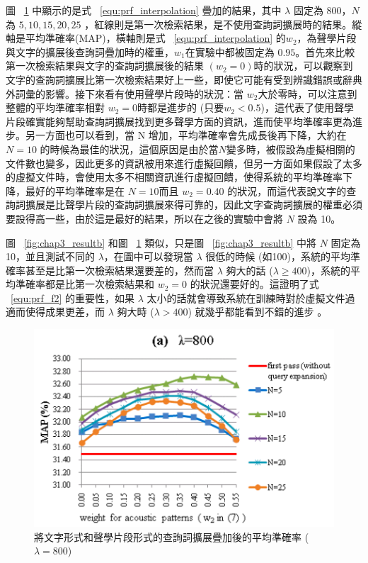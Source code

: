 圖 ~\ref{fig:chap3_resulta} 中顯示的是式 ~\ref{equ:prf_interpolation} 疊加的結果，其中 $\lambda$ 固定為 800，$N$ 為 $5, 10, 15, 20, 25$ ，紅線則是第一次檢索結果，是不使用查詢詞擴展時的結果。縱軸是平均準確率(MAP)，橫軸則是式 ~\ref{equ:prf_interpolation} 的$w_2$，為聲學片段與文字的擴展後查詢詞疊加時的權重，$w_1$在實驗中都被固定為 $0.95$。首先來比較第一次檢索結果與文字的查詢詞擴展後的結果 $(w_2 =
0)$時的狀況，可以觀察到文字的查詢詞擴展比第一次檢索結果好上一些，即使它可能有受到辨識錯誤或辭典外詞彙的影響。接下來看有使用聲學片段時的狀況：當 $w_2$大於零時，可以注意到整體的平均準確率相對 $w_2 = 0$時都是進步的 (只要$w_2 < 0.5$)，這代表了使用聲學片段確實能夠幫助查詢詞擴展找到更多聲學方面的資訊，進而使平均準確率更為進步。另一方面也可以看到，當 N 增加，平均準確率會先成長後再下降，大約在 $N=10$
的時候為最佳的狀況，這個原因是由於當$N$變多時，被假設為虛擬相關的文件數也變多，因此更多的資訊被用來進行虛擬回饋，但另一方面如果假設了太多的虛擬文件時，會使用太多不相關資訊進行虛擬回饋，使得系統的平均準確率下降，最好的平均準確率是在 $N=10$而且 $w_2 = 0.40$ 的狀況，而這代表說文字的查詢詞擴展是比聲學片段的查詢詞擴展來得可靠的，因此文字查詢詞擴展的權重必須要設得高一些，由於這是最好的結果，所以在之後的實驗中會將 $N$ 設為 10。

圖 ~\ref{fig:chap3_resultb} 和圖 ~\ref{fig:chap3_resulta} 類似，只是圖 ~\ref{fig:chap3_resultb} 中將 $N$ 固定為 10，並且測試不同的 $\lambda$，在圖中可以發現當 $\lambda$ 很低的時候 (如100)，系統的平均準確率甚至是比第一次檢索結果還要差的，然而當 $\lambda$ 夠大的話 ($\lambda \geq 400$)，系統的平均準確率都是比第一次檢索結果和 $w_2 = 0$ 的狀況還要好的。這證明了式 ~\ref{equ:prf_f2} 的重要性，如果 $\lambda$ 太小的話就會導致系統在訓練時對於虛擬文件過適而使得成果更差，而 $\lambda$ 夠大時 ($\lambda > 400$) 就幾乎都能看到不錯的進步 。  

\begin{figure}
\centering
\includegraphics[scale=0.4]{images/chap3_resulta.png}
\caption{將文字形式和聲學片段形式的查詢詞擴展疊加後的平均準確率 ($\lambda = 800$)} \label{fig:chap3_resulta}
\end{figure}


